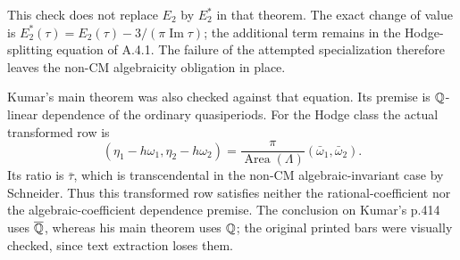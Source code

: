 This check does not replace $E_2$ by $E_2^*$ in that
theorem. The exact change of value is
$E_2^*(\tau)=E_2(\tau)-3/(\pi\operatorname{Im}\tau)$;
the additional term remains in the Hodge-splitting equation
of A.4.1. The failure of the attempted specialization
therefore leaves the non-CM algebraicity obligation in place.

Kumar's main theorem \cite[p.410, with Lemma 3 on p.412]{Kumar2021}
was also checked against that equation. Its premise is
$\mathbb Q$-linear dependence of the ordinary quasiperiods.
For the Hodge class the actual transformed row is
\[
 (\eta_1-h\omega_1,\eta_2-h\omega_2)
   =\frac{\pi}{\operatorname{Area}(\Lambda)}
        (\bar\omega_1,\bar\omega_2).
\]
Its ratio is $\bar\tau$, which is transcendental in the
non-CM algebraic-invariant case by Schneider. Thus this
transformed row satisfies neither the rational-coefficient
nor the algebraic-coefficient dependence premise. The
conclusion on Kumar's p.414 uses $\overline{\mathbb Q}$, whereas his main
theorem uses $\mathbb Q$; the original printed bars were visually
checked, since text extraction loses them.

